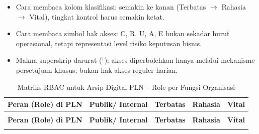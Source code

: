 \documentclass[12pt,a4paper]{report}
\begin{document}
\begin{itemize}[leftmargin=*]
  \item Cara membaca kolom klasifikasi: semakin ke kanan (Terbatas $\rightarrow$ Rahasia $\rightarrow$ Vital), tingkat kontrol harus semakin ketat.
  \item Cara membaca simbol hak akses: C, R, U, A, E bukan sekadar huruf operasional, tetapi representasi level risiko keputusan bisnis.
  \item Makna superskrip darurat ($^{\dagger}$): akses diperbolehkan hanya melalui mekanisme persetujuan khusus; bukan hak akses reguler harian.
\end{itemize}

\begingroup
\footnotesize
\renewcommand{\arraystretch}{1.4}
\begin{xltabular}{\textwidth}{@{} >{\raggedright\arraybackslash}p{2.8cm} Y Y Y Y @{}}
\caption{Matriks RBAC untuk Arsip Digital PLN -- Role per Fungsi Organisasi}
\label{tab:matriks-rbac}\\
\textbf{Peran (Role) di PLN} & \textbf{Publik/ Internal} & \textbf{Terbatas} & \textbf{Rahasia} & \textbf{Vital} \\
\midrule
\endfirsthead

\\
\textbf{Peran (Role) di PLN} & \textbf{Publik/ Internal} & \textbf{Terbatas} & \textbf{Rahasia} & \textbf{Vital} \\
\midrule
\endhead

\bottomrule
\endfoot


\end{xltabular}
\end{document}
